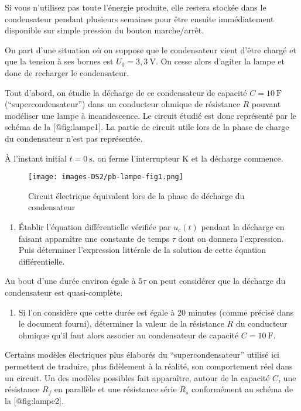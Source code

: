 Si vous n'utilisez pas toute l'énergie produite, elle restera stockée
dans le condensateur pendant plusieurs semaines pour être ensuite
immédiatement disponible sur simple pression du bouton marche/arrêt.

On part d'une situation où on suppose que le condensateur vient d'être
chargé et que la tension à ses bornes est \(U_0 = 3,3\ \mathrm{V}\). On
cesse alors d'agiter la lampe et donc de recharger le condensateur.

Tout d'abord, on étudie la décharge de ce condensateur de capacité
\(C = 10\ \mathrm{F}\) (``supercondensateur'') dans un conducteur
ohmique de résistance \(R\) pouvant modéliser une lampe à incandescence.
Le circuit étudié est donc représenté par le schéma de la
{[}@fig:lampe1{]}. La partie de circuit utile lors de la phase de charge
du condensateur n'est pas représentée.

À l'instant initial \(t = 0\ \mathrm{s}\), on ferme l'interrupteur K et
la décharge commence.

\begin{figure}
\hypertarget{fig:lampe1}{%
\centering
\texttt{[image: images-DS2/pb-lampe-fig1.png]}
\caption{Circuit électrique équivalent lors de la phase de décharge du
condensateur}\label{fig:lampe1}
}
\end{figure}

\begin{enumerate}
\def\labelenumi{\arabic{enumi}.}
\tightlist
\item
  Établir l'équation différentielle vérifiée par \(u_c(t)\) pendant la
  décharge en faisant apparaître une constante de temps \(\tau\) dont on
  donnera l'expression. Puis déterminer l'expression littérale de la
  solution de cette équation différentielle.
\end{enumerate}

Au bout d'une durée environ égale à \(5\tau\) on peut considérer que la
décharge du condensateur est quasi-complète.

\begin{enumerate}
\def\labelenumi{\arabic{enumi}.}
\setcounter{enumi}{1}
\tightlist
\item
  Si l'on considère que cette durée est égale à 20 minutes (comme
  précisé dans le document fourni), déterminer la valeur de la
  résistance \(R\) du conducteur ohmique qu'il faut alors associer au
  condensateur de capacité \(C = 10\ \mathrm{F}\).
\end{enumerate}

Certains modèles électriques plus élaborés du ``supercondensateur''
utilisé ici permettent de traduire, plus fidèlement à la réalité, son
comportement réel dans un circuit. Un des modèles possibles fait
apparaître, autour de la capacité \(C\), une résistance \(R_f\) en
parallèle et une résistance série \(R_s\) conformément au schéma de la
{[}@fig:lampe2{]}.

